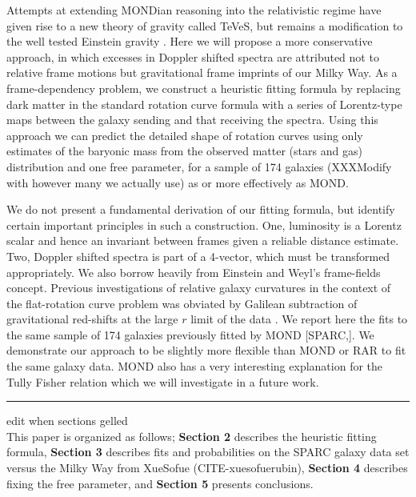 \documentclass[reprint,%
 amsmath,amssymb,
 aps,
]{revtex4-1}
\begin{document}
 
 
  Attempts at extending MONDian reasoning into the relativistic regime have given rise to a new theory of gravity called TeVeS, but remains  a modification to the well tested Einstein gravity  \cite{PhysRevD.70.083509}.
 Here we will propose a more conservative approach, in which excesses in Doppler shifted spectra are attributed not to relative frame motions but gravitational frame imprints of our Milky Way.    As    a frame-dependency problem,  we construct a heuristic fitting formula by  replacing dark matter in the standard rotation curve formula with a series of Lorentz-type maps between the galaxy sending and that receiving the spectra. Using this approach we
 can predict  the   detailed shape of rotation curves  using  only estimates of the baryonic mass from the observed matter (stars
and gas) distribution and one free parameter,  for a sample of 174 galaxies (XXXModify with however many we actually use) as or more effectively as MOND. 
 
   
  We do not present a fundamental derivation of our fitting formula, but   identify certain important principles in such a construction. One,  luminosity is a Lorentz scalar and hence an invariant between frames given a reliable distance estimate. Two,  Doppler shifted spectra  is part of a 4-vector, which must be transformed    appropriately.   We also   borrow heavily from Einstein and Weyl's frame-fields concept.  Previous investigations of    relative galaxy curvatures in the context of the flat-rotation curve problem was obviated   by  Galilean subtraction of   gravitational red-shifts at the  large $r$  limit of the data \citep{MTW}.    
   We report here the  fits to the same sample of 174 galaxies previously fitted by MOND  [SPARC\cite{2016Lelli},\cite{McGaugh2016RAR}]. We demonstrate   our approach to be slightly more flexible than MOND or RAR to fit the  same galaxy data.    
  MOND also has a very interesting explanation for the 
   Tully Fisher relation which we will investigate  in a future work.  
 
 
 
 
  
  
  
 
  
 
 {\color{teal} \rule{\linewidth}{0.5mm}}
 {\color{teal} edit when sections gelled}\\
This paper  is organized as follows;
{\bf Section 2} describes the heuristic  fitting formula, 
{\bf Section 3} describes fits and probabilities on the
 SPARC galaxy data set versus    the Milky Way from  XueSofue (CITE-xuesofuerubin), 
 {\bf Section 4} describes fixing the free parameter,   and  {\bf Section 5}  presents conclusions.     
  
\end{document}
